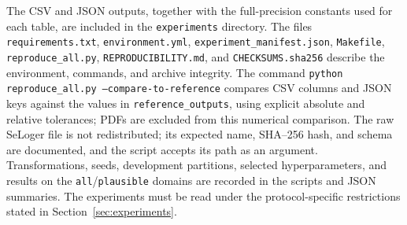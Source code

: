 The CSV and JSON outputs, together with the full-precision constants used for each table, are included in the \texttt{experiments} directory. The files \texttt{requirements.txt}, \texttt{environment.yml}, \texttt{experiment\_manifest.json}, \texttt{Makefile}, \texttt{reproduce\_all.py}, \texttt{REPRODUCIBILITY.md}, and \texttt{CHECKSUMS.sha256} describe the environment, commands, and archive integrity. The command \texttt{python reproduce\_all.py --compare-to-reference} compares CSV columns and JSON keys against the values in \texttt{reference\_outputs}, using explicit absolute and relative tolerances; PDFs are excluded from this numerical comparison. The raw SeLoger file is not redistributed; its expected name, SHA--256 hash, and schema are documented, and the script accepts its path as an argument. Transformations, seeds, development partitions, selected hyperparameters, and results on the \texttt{all}/\texttt{plausible} domains are recorded in the scripts and JSON summaries. The experiments must be read under the protocol-specific restrictions stated in Section~\ref{sec:experiments}.

\renewcommand{\refname}{References}



